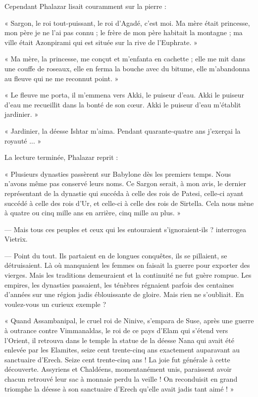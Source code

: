 \documentclass[a4paper, 11pt, oneside, polutonikogreek, french]{article}
\begin{document}
Cependant Phalazar lisait couramment sur la pierre :

« Sargon, le roi tout-puissant, le roi d'Agadé, c'est moi. Ma mère était princesse, mon père je ne l'ai pas connu ; le frère de mon père habitait la montagne ; ma ville était Azonpirami qui est située sur la rive de l'Euphrate. »

« Ma mère, la princesse, me conçut et m'enfanta en cachette ; elle me mit dans une couffe de roseaux, elle en ferma la bouche avec du bitume, elle m'abandonna au fleuve qui ne me reconnut point. »

« Le fleuve me porta, il m'emmena vers Akki, le puiseur d'eau. Akki le puiseur d'eau me recueillit dans la bonté de son cœur. Akki le puiseur d'eau m'établit jardinier. »

« Jardinier, la déesse Ishtar m'aima. Pendant quarante-quatre ans j'exerçai la royauté ... »

\bigskip
\centerline{\EightStarTaper}
\centerline{\EightStarTaper\EightStarTaper}
\bigskip

La lecture terminée, Phalazar reprit :

« Plusieurs dynasties passèrent sur Babylone dès les premiers temps. Nous n'avons même pas conservé leurs noms. Ce Sargon serait, à mon avis, le dernier représentant de la dynastie qui succéda à celle des rois de Patesi, celle-ci ayant succédé à celle des rois d'Ur, et celle-ci à celle des rois de Sirtella. Cela nous mène à quatre ou cinq mille ans en arrière, cinq mille au plus. »

--- Mais tous ces peuples et ceux qui les entouraient s'ignoraient-ils ? interrogea Vietrix.

--- Point du tout. Ils partaient en de longues conquêtes, ils se pillaient, se détruisaient. Là où manquaient les femmes on faisait la guerre pour exporter des vierges. Mais les traditions demeuraient et la continuité ne fut guère rompue. Les empires, les dynasties passaient, les ténèbres régnaient parfois des centaines d'années sur une région jadis éblouissante de gloire. Mais rien ne s'oubliait. En voulez-vous un curieux exemple ?

« Quand Assambanipal, le cruel roi de Ninive, s'empara de Suse, après une guerre à outrance contre Vimmanaldas, le roi de ce pays d'Elam qui s'étend vers l'Orient, il retrouva dans le temple la statue de la déesse Nana qui avait été enlevée par les Elamites, seize cent trente-cinq ans exactement auparavant au sanctuaire d'Erech. Seize cent trente-cinq ans ! La joie fut générale à cette découverte. Assyriens et Chaldéens, momentanément unis, paraissent avoir chacun retrouvé leur sac à monnaie perdu la veille ! On reconduisit en grand triomphe la déesse à son sanctuaire d'Erech qu'elle avait jadis tant aimé ! »
\end{document}
